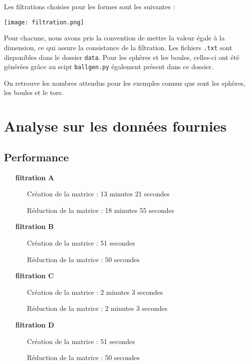 \documentclass[french, a4paper, 12pt]{article}
\begin{document}
Les filtrations choisies pour les formes sont les suivantes : 

\texttt{[image: filtration.png]}

Pour chacune, nous avons pris la convention de mettre la valeur 
égale à la dimension, ce qui assure la consistance de la filtration. 
Les fichiers \texttt{.txt} sont disponibles dans le dossier 
\texttt{data}. Pour les sphères et les boules, celles-ci ont été 
générées grâce au scipt \texttt{ballgen.py} également présent dans
ce dossier.

\vskip 0.5cm

On retrouve les nombres attendus pour les exemples connus que sont 
les sphères, les boules et le tore.

\section{Analyse sur les données fournies}

\subsection{Performance}

\begin{itemize}
    \item[\textbf{filtration A}] \hspace{1cm}
        \begin{itemize}
            \item[Création de la matrice :] 13 minutes 21 secondes
            \item[Réduction de la matrice :] 18 minutes 55 secondes 
        \end{itemize}
    \item[\textbf{filtration B}] \hspace{1cm}
        \begin{itemize}
            \item[Création de la matrice :] 51 secondes
            \item[Réduction de la matrice :] 50 secondes 
        \end{itemize}
    \item[\textbf{filtration C}] \hspace{1cm}
        \begin{itemize}
            \item[Création de la matrice :] 2 minutes 3 secondes
            \item[Réduction de la matrice :] 2 minutes 3 secondes 
        \end{itemize}
    \item[\textbf{filtration D}] \hspace{1cm}
        \begin{itemize}
            \item[Création de la matrice :] 51 secondes
            \item[Réduction de la matrice :] 50 secondes 
        \end{itemize}
\end{itemize}
\end{document}
